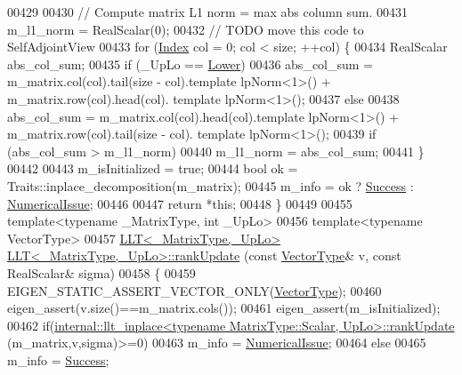 \begin{DoxyCode}
00429 
00430   \textcolor{comment}{// Compute matrix L1 norm = max abs column sum.}
00431   m\_l1\_norm = RealScalar(0);
00432   \textcolor{comment}{// TODO move this code to SelfAdjointView}
00433   \textcolor{keywordflow}{for} (\hyperlink{group___cholesky___module_ac7a64274814fa76e8b1e9e945546037f}{Index} col = 0; col < size; ++col) \{
00434     RealScalar abs\_col\_sum;
00435     \textcolor{keywordflow}{if} (\_UpLo == \hyperlink{group__enums_gga39e3366ff5554d731e7dc8bb642f83cda891792b8ed394f7607ab16dd716f60e6}{Lower})
00436       abs\_col\_sum = m\_matrix.col(col).tail(size - col).template lpNorm<1>() + m\_matrix.row(col).head(col).
      template lpNorm<1>();
00437     \textcolor{keywordflow}{else}
00438       abs\_col\_sum = m\_matrix.col(col).head(col).template lpNorm<1>() + m\_matrix.row(col).tail(size - col).
      template lpNorm<1>();
00439     \textcolor{keywordflow}{if} (abs\_col\_sum > m\_l1\_norm)
00440       m\_l1\_norm = abs\_col\_sum;
00441   \}
00442 
00443   m\_isInitialized = \textcolor{keyword}{true};
00444   \textcolor{keywordtype}{bool} ok = Traits::inplace\_decomposition(m\_matrix);
00445   m\_info = ok ? \hyperlink{group__enums_gga85fad7b87587764e5cf6b513a9e0ee5ea52581b035f4b59c203b8ff999ef5fcea}{Success} : \hyperlink{group__enums_gga85fad7b87587764e5cf6b513a9e0ee5eaaf9b736d310a664e7729d163a035cc5f}{NumericalIssue};
00446 
00447   \textcolor{keywordflow}{return} *\textcolor{keyword}{this};
00448 \}
00449 
00455 \textcolor{keyword}{template}<\textcolor{keyword}{typename} \_MatrixType, \textcolor{keywordtype}{int} \_UpLo>
00456 \textcolor{keyword}{template}<\textcolor{keyword}{typename} VectorType>
00457 \hyperlink{group___cholesky___module_class_eigen_1_1_l_l_t}{LLT<\_MatrixType,\_UpLo>} \hyperlink{group___cholesky___module_class_eigen_1_1_l_l_t}{LLT<\_MatrixType,\_UpLo>::rankUpdate}
      (\textcolor{keyword}{const} \hyperlink{struct_vector_type}{VectorType}& v, \textcolor{keyword}{const} RealScalar& sigma)
00458 \{
00459   EIGEN\_STATIC\_ASSERT\_VECTOR\_ONLY(\hyperlink{struct_vector_type}{VectorType});
00460   eigen\_assert(v.size()==m\_matrix.cols());
00461   eigen\_assert(m\_isInitialized);
00462   \textcolor{keywordflow}{if}(\hyperlink{struct_eigen_1_1internal_1_1llt__inplace}{internal::llt\_inplace<typename MatrixType::Scalar, UpLo>::rankUpdate}
      (m\_matrix,v,sigma)>=0)
00463     m\_info = \hyperlink{group__enums_gga85fad7b87587764e5cf6b513a9e0ee5eaaf9b736d310a664e7729d163a035cc5f}{NumericalIssue};
00464   \textcolor{keywordflow}{else}
00465     m\_info = \hyperlink{group__enums_gga85fad7b87587764e5cf6b513a9e0ee5ea52581b035f4b59c203b8ff999ef5fcea}{Success};

\end{DoxyCode}
